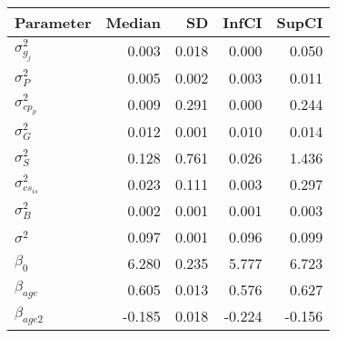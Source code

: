 \begin{table}[ht]
\centering
\begin{tabular}{lrrrr}
  \hline
Parameter & Median & SD & InfCI & SupCI \\ 
  \hline
$\sigma^{2}_{g_{j}}$ & 0.003 & 0.018 & 0.000 & 0.050 \\ 
  $\sigma^{2}_{P}$ & 0.005 & 0.002 & 0.003 & 0.011 \\ 
  $\sigma^{2}_{cp_{p}}$ & 0.009 & 0.291 & 0.000 & 0.244 \\ 
  $\sigma^{2}_{G}$ & 0.012 & 0.001 & 0.010 & 0.014 \\ 
  $\sigma^{2}_{S}$ & 0.128 & 0.761 & 0.026 & 1.436 \\ 
  $\sigma^{2}_{cs_{is}}$ & 0.023 & 0.111 & 0.003 & 0.297 \\ 
  $\sigma^{2}_{B}$ & 0.002 & 0.001 & 0.001 & 0.003 \\ 
  $\sigma^{2}$ & 0.097 & 0.001 & 0.096 & 0.099 \\ 
  $\beta_{0}$ & 6.280 & 0.235 & 5.777 & 6.723 \\ 
  $\beta_{age}$ & 0.605 & 0.013 & 0.576 & 0.627 \\ 
  $\beta_{age2}$ & -0.185 & 0.018 & -0.224 & -0.156 \\ 
   \hline
\end{tabular}
\end{table}
